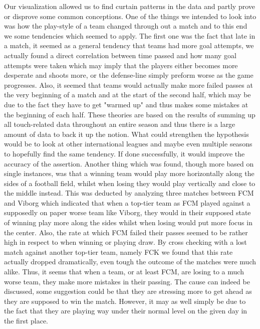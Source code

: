 \documentclass[Report.tex]{subfiles}
\begin{document}
 

Our visualization allowed us to find curtain patterns in the data and partly prove or disprove some common conceptions. One of the things we intended to look into was how the play-style of a team changed through out a match and to this end we some tendencies which seemed to apply. The first one was the fact that late in a match, it seemed as a general tendency that teams had more goal attempts, we actually found a direct correlation between time passed and how many goal attempts were taken which may imply that the players either becomes more desperate and shoots more, or the defense-line simply preform worse as the game progresses. Also, it seemed that teams would actually make more failed passes at the very beginning of a match and at the start of the second half, which may be due to the fact they  have to get "warmed up" and thus makes some mistakes at the beginning of each half.
These theories are based on the results of summing up all touch-related data throughout an entire season and thus there is a large amount of data to back it up the notion. What could strengthen the hypothesis would be to look at other international leagues and maybe even multiple seasons to hopefully find the same tendency. If done successfully, it would improve the accuracy of the assertion.
Another thing which was found, though more based on single instances, was that a winning team would play more horizontally along the sides of a football field, whilst when losing they would play vertically and close to the middle instead. This was deducted by analyzing three matches between FCM and Viborg which indicated that when a top-tier team as FCM played against a supposedly on paper worse team like Viborg, they would in their supposed state of winning play more along the sides whilst when losing would put more focus in the center. Also, the rate at which FCM failed their passes seemed to be rather high in respect to when winning or playing draw. By cross checking with a lost match against another top-tier team, namely FCK we found that this rate actually dropped dramatically, even tough the outcome of the matches were much alike. Thus, it seems that when a team, or at least FCM, are losing to a much worse team, they make more mistakes in their passing. The cause can indeed be discussed, some suggestion could be that they are stressing more to get ahead as they are supposed to win the match. However, it may as well simply be due to the fact that they are playing way under their normal level on the given day in the first place. 
\end{document}
